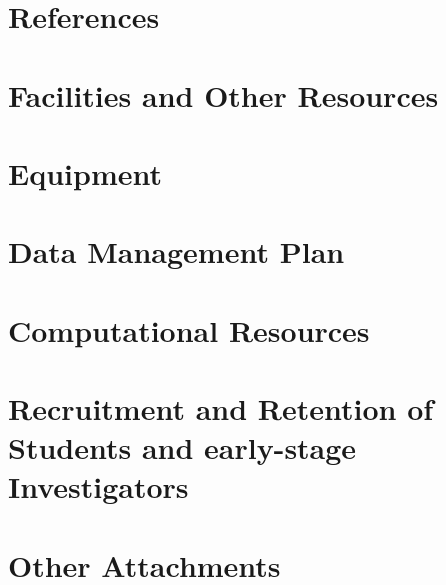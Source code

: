 \documentclass[11pt]{article}
\begin{document}
\thispagestyle{empty}
\AddToShipoutPicture*{\BackgroundPic}


\clearpage
{}

\thispagestyle{fancy}
\setlength{\headheight}{19.7478pt}
\setlength{\headsep}{4pt}
\newlength{\nsfoffset}
\setlength{\nsfoffset}{\headheight}
\addtolength{\nsfoffset}{\baselineskip}



\clearpage

\appendix




\clearpage




\clearpage

%
\section{References}
\printbibliography[heading=bibempty]
\clearpage

\section{Facilities and Other Resources}\label{sec:facilities}


\section{Equipment}\label{sec:equipment}


\section{Data Management Plan}\label{sec:dataplan}


\section{Computational Resources}\label{sec:resources}


\section{Recruitment and Retention of Students and early-stage Investigators}\label{sec:recruitment}


\section{Other Attachments}\label{sec:other}

\end{document}
